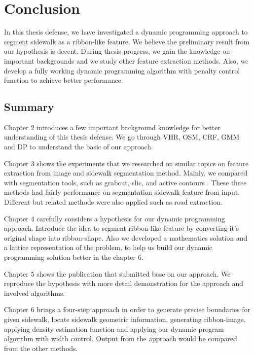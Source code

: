 \chapter{Conclusion}
In this thesis defense, we have investigated a dynamic programming approach to segment sidewalk as a ribbon-like feature. We believe the preliminary result from our hypothesis is decent. During thesis progress, we gain the knowledge on important backgrounds and we study other feature extraction methods. Also, we develop a fully working dynamic programming algorithm with penalty control function to achieve better performance.

\section{Summary}
Chapter 2 introduces a few important background knowledge for better understanding of this thesis defense. We go through \ac{VHR}, \ac{OSM}\cite{OpenStreetMap}, \ac{CRF}\cite{MAL-013}, \ac{GMM}\cite{sridharan2014gaussian} and \ac{DP}\cite{bellman2013dynamic} to understand the basic of our approach.   

Chapter 3 shows the experiments that we researched on similar topics on feature extraction from image and sidewalk segmentation method. Mainly, we compared with segmentation tools, such as grabcut\cite{Rother2004-ou}, slic\cite{Achanta:149300}, and active contours \cite{Kass88snakes:active}. These three methods had fairly performance on segmentation sidewalk feature from input. Different but related methods were also applied such as road extraction\cite{road_detect}.

Chapter 4 carefully considers a hypothesis for our dynamic programming approach. Introduce the idea to segment ribbon-like feature by converting it's original shape into ribbon-shape. Also we developed a mathematics solution and a lattice representation of the problem, to help us build our dynamic programming solution better in the chapter 6.

Chapter 5 shows the publication that submitted base on our approach. We reproduce the hypothesis with more detail demonstration for the approach and involved algorithms. 

Chapter 6 brings a four-step approach in order to generate precise boundaries for given sidewalk, locate sidewalk geometric information, generating ribbon-image, applying density estimation function and applying our dynamic program algorithm with width control. Output from the approach would be compared from the other methods.

